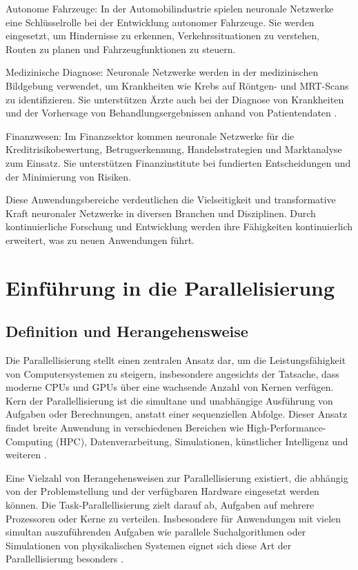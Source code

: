 Autonome Fahrzeuge: In der Automobilindustrie spielen neuronale Netzwerke eine Schlüsselrolle bei der Entwicklung autonomer Fahrzeuge. Sie werden eingesetzt, um Hindernisse zu erkennen, Verkehrssituationen zu verstehen, Routen zu planen und Fahrzeugfunktionen zu steuern.

Medizinische Diagnose: Neuronale Netzwerke werden in der medizinischen Bildgebung verwendet, um Krankheiten wie Krebs auf Röntgen- und MRT-Scans zu identifizieren. Sie unterstützen Ärzte auch bei der Diagnose von Krankheiten und der Vorhersage von Behandlungsergebnissen anhand von Patientendaten \citep{LeCun_Deep_Learning}.

Finanzwesen: Im Finanzsektor kommen neuronale Netzwerke für die Kreditrisikobewertung, Betrugserkennung, Handelsstrategien und Marktanalyse zum Einsatz. Sie unterstützen Finanzinstitute bei fundierten Entscheidungen und der Minimierung von Risiken.

Diese Anwendungsbereiche verdeutlichen die Vielseitigkeit und transformative Kraft neuronaler Netzwerke in diversen Branchen und Disziplinen. Durch kontinuierliche Forschung und Entwicklung werden ihre Fähigkeiten kontinuierlich erweitert, was zu neuen Anwendungen führt.

\section{Einführung in die Parallelisierung}
\label{sec:Grundlagen_Parallelisierung}
\subsection{Definition und Herangehensweise}
\label{sec:Grundlagen_Parallelisierung_Herangehensweise}
Die Parallellisierung stellt einen zentralen Ansatz dar, um die Leistungsfähigkeit von Computersystemen zu steigern, insbesondere angesichts der Tatsache, dass moderne CPUs und GPUs über eine wachsende Anzahl von Kernen verfügen. Kern der Parallellisierung ist die simultane und unabhängige Ausführung von Aufgaben oder Berechnungen, anstatt einer sequenziellen Abfolge. Dieser Ansatz findet breite Anwendung in verschiedenen Bereichen wie High-Performance-Computing (HPC), Datenverarbeitung, Simulationen, künstlicher Intelligenz und weiteren \citep{Flynn_Computer_Organizations_and_their_Effectiveness}.

Eine Vielzahl von Herangehensweisen zur Parallellisierung existiert, die abhängig von der Problemstellung und der verfügbaren Hardware eingesetzt werden können. Die Task-Parallellisierung zielt darauf ab, Aufgaben auf mehrere Prozessoren oder Kerne zu verteilen. Insbesondere für Anwendungen mit vielen simultan auszuführenden Aufgaben wie parallele Suchalgorithmen oder Simulationen von physikalischen Systemen eignet sich diese Art der Parallellisierung besonders \citep{Flynn_Computer_Organizations_and_their_Effectiveness}.

